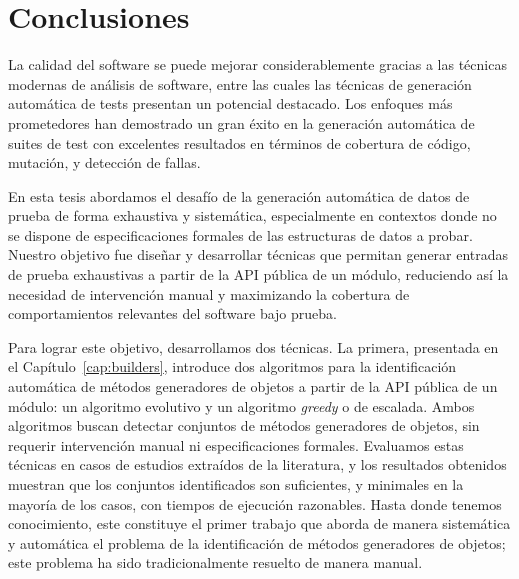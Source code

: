 \chapter{Conclusiones}
\label{cap:conclutions}

La calidad del software se puede mejorar considerablemente gracias a las
técnicas modernas de análisis de software, 
entre las cuales las técnicas de generación automática de tests presentan un
potencial destacado.
Los enfoques más prometedores han demostrado un gran éxito en la generación
automática de suites de test con excelentes resultados en términos de cobertura
de código, mutación, y detección de fallas. 


En esta tesis abordamos el desafío de la generación automática de datos de prueba de forma exhaustiva y sistemática, 
especialmente en contextos donde no se dispone de especificaciones formales de las estructuras de datos a probar. 
Nuestro objetivo fue diseñar y desarrollar técnicas que permitan generar entradas de prueba exhaustivas a partir de la API pública de un módulo, 
reduciendo así la necesidad de intervención manual y maximizando la cobertura de comportamientos relevantes del software bajo prueba.

Para lograr este objetivo, desarrollamos dos técnicas. La primera, presentada en el Capítulo~\ref{cap:builders}, 
introduce dos algoritmos para la identificación automática de métodos generadores de objetos a partir de la API pública de un módulo: un algoritmo evolutivo y un algoritmo \emph{greedy} o de escalada.
Ambos algoritmos buscan detectar conjuntos de métodos generadores de objetos, 
sin requerir intervención manual ni especificaciones formales. 
Evaluamos estas técnicas en casos de estudios extraídos de la literatura, 
y los resultados obtenidos muestran que los conjuntos identificados son
suficientes, y minimales en la mayoría de los casos, con tiempos de ejecución razonables. 
Hasta donde tenemos conocimiento, este constituye el primer trabajo que aborda
de manera sistemática y automática el problema de la identificación de métodos
generadores de objetos; este problema ha sido tradicionalmente resuelto de manera manual.

